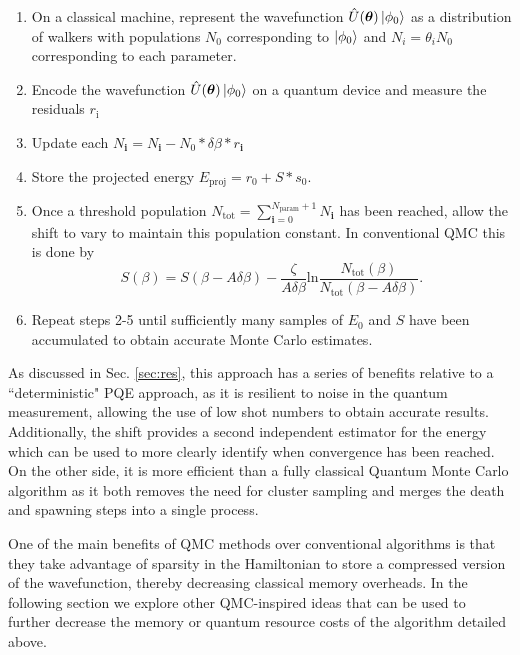 \documentclass[%
 reprint,
 amsmath,amssymb,
 aps,
]{revtex4-2}
\begin{document}
\begin{enumerate}
    \item On a classical machine, represent the wavefunction $\hat U (\boldsymbol{\theta})\ket{\phi_0}$ as a distribution of walkers with populations $N_0$ corresponding to $\ket{\phi_0}$ and $N_i = \theta_i N_0$ corresponding to each parameter.
    \item Encode the wavefunction $\hat U (\boldsymbol{\theta})\ket{\phi_0}$ on a quantum device and measure the residuals $r_\mathrm{i}$
    \item Update each $N_\mathbf{i} = N_\mathbf{i} - N_0 * \delta\beta*r_\mathbf{i}$
    \item Store the projected energy $E_\mathrm{proj} = r_0 + S * s_0$.
    \item Once a threshold population $N_\mathrm{tot} = \sum_{\mathbf{i}=0}^{N_\mathrm{param} +1} N_\mathbf{i}$ has been reached, allow the shift to vary to maintain this population constant. In conventional QMC this is done by\cite{Booth2009}
    \begin{equation}
        S(\beta) = S(\beta - A\delta\beta) - \frac{\zeta}{A\delta\beta}\mathrm{ln}\frac{N_\mathrm{tot}(\beta)}{N_\mathrm{tot}(\beta - A\delta\beta)}.
        \label{eq:shift}
    \end{equation}
    \item Repeat steps 2-5 until sufficiently many samples of $E_0$ and $S$ have been accumulated to obtain accurate Monte Carlo estimates.
\end{enumerate}
As discussed in Sec. \ref{sec:res}, this approach has a series of benefits relative to a ``deterministic" PQE approach, as it is resilient to noise in the quantum measurement, allowing the use of low shot numbers to obtain accurate results. Additionally, the shift provides a second independent estimator for the energy which can be used to more clearly identify when convergence has been reached. On the other side, it is more efficient than a fully classical Quantum Monte Carlo algorithm as it both removes the need for cluster sampling and merges the death and spawning steps into a single process.

One of the main benefits of QMC methods over conventional algorithms is that they take advantage of sparsity in the Hamiltonian to store a compressed version of the wavefunction, thereby decreasing classical memory overheads. In the following section we explore other QMC-inspired ideas that can be used to further decrease the memory or quantum resource costs of the algorithm detailed above.
\end{document}
